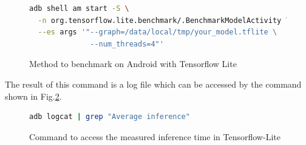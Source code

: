 \begin{figure}[h]
\begin{lstlisting}[language=bash]
adb shell am start -S \
  -n org.tensorflow.lite.benchmark/.BenchmarkModelActivity \
  --es args '"--graph=/data/local/tmp/your_model.tflite \
              --num_threads=4"'
\end{lstlisting}
\caption[Method to benchmark on Android with Tensorflow Lite]{Method to benchmark on Android with Tensorflow Lite \cite{tensorflow2015-whitepaper}}
\label{fig:bench_ten_lite_an}
\end{figure}


The result of this command is a log file which can be accessed by the command shown in Fig.\ref{fig:inf_ten}.\\
\begin{figure}[h]
\begin{lstlisting}[language=bash]
adb logcat | grep "Average inference"
\end{lstlisting}
\caption[Command to access the measured inference time in Tensorflow-Lite]{Command to access the measured inference time in Tensorflow-Lite \cite{tensorflow2015-whitepaper}}
\label{fig:inf_ten}
\end{figure}




